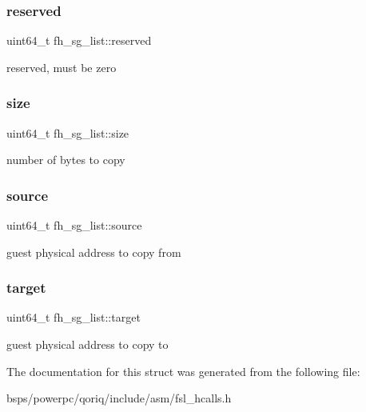 \subsubsection{\texorpdfstring{reserved}{reserved}}
{\footnotesize\ttfamily uint64\+\_\+t fh\+\_\+sg\+\_\+list\+::reserved}

reserved, must be zero \mbox{\label{structfh__sg__list_a79cd752dd375fed24e391bf2ffa47e59}} 
\subsubsection{\texorpdfstring{size}{size}}
{\footnotesize\ttfamily uint64\+\_\+t fh\+\_\+sg\+\_\+list\+::size}

number of bytes to copy \mbox{\label{structfh__sg__list_a4eb47bcfd3fda820c8d3c178700b12f5}} 
\subsubsection{\texorpdfstring{source}{source}}
{\footnotesize\ttfamily uint64\+\_\+t fh\+\_\+sg\+\_\+list\+::source}

guest physical address to copy from \mbox{\label{structfh__sg__list_ad54786fd1a430df2d643b6d6561941a5}} 
\subsubsection{\texorpdfstring{target}{target}}
{\footnotesize\ttfamily uint64\+\_\+t fh\+\_\+sg\+\_\+list\+::target}

guest physical address to copy to 

The documentation for this struct was generated from the following file\+:\begin{DoxyCompactItemize}
\item 
bsps/powerpc/qoriq/include/asm/fsl\+\_\+hcalls.\+h\end{DoxyCompactItemize}
